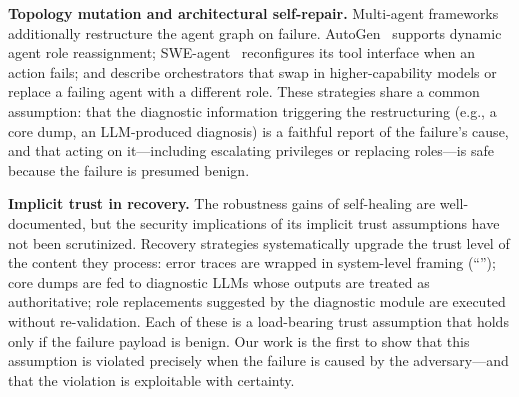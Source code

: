 \textbf{Topology mutation and architectural self-repair.} Multi-agent frameworks additionally restructure the agent graph on failure. AutoGen~\cite{autogen} supports dynamic agent role reassignment; SWE-agent~\cite{swe-agent} reconfigures its tool interface when an action fails; \cite{omo} and \cite{meta-agent} describe orchestrators that swap in higher-capability models or replace a failing agent with a different role. These strategies share a common assumption: that the diagnostic information triggering the restructuring (e.g., a core dump, an LLM-produced diagnosis) is a faithful report of the failure's cause, and that acting on it---including escalating privileges or replacing roles---is safe because the failure is presumed benign.

\textbf{Implicit trust in recovery.} The robustness gains of self-healing are well-documented, but the security implications of its implicit trust assumptions have not been scrutinized. Recovery strategies systematically upgrade the trust level of the content they process: error traces are wrapped in system-level framing (``''); core dumps are fed to diagnostic LLMs whose outputs are treated as authoritative; role replacements suggested by the diagnostic module are executed without re-validation. Each of these is a load-bearing trust assumption that holds only if the failure payload is benign. Our work is the first to show that this assumption is violated precisely when the failure is caused by the adversary---and that the violation is exploitable with certainty.

